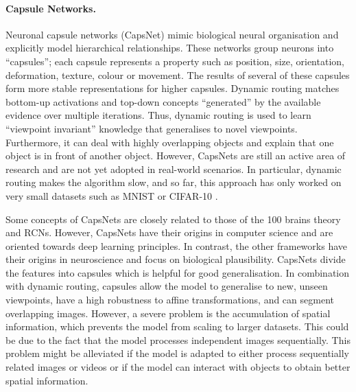 \paragraph{Capsule Networks.} Neuronal capsule networks (CapsNet)  mimic biological neural organisation and explicitly model hierarchical relationships. These networks group neurons into ``capsules''; each capsule represents a property such as position, size, orientation, deformation, texture, colour or movement. The results of several of these capsules form more stable representations for higher capsules. Dynamic routing matches bottom-up activations and top-down concepts ``generated'' by the available evidence over multiple iterations. Thus, dynamic routing is used to learn ``viewpoint invariant'' knowledge that generalises to novel viewpoints.
Furthermore, it can deal with highly overlapping objects and explain that one object is in front of another object. However, CapsNets are still an active area of research and are not yet adopted in real-world scenarios. In particular, dynamic routing makes the algorithm slow, and so far, this approach has only worked on very small datasets such as MNIST \cite{lecun_gradient-based_1998} or CIFAR-10 \cite{krizhevsky_learning_2009}.

Some concepts of CapsNets are closely related to those of the 100 brains theory and RCNs. However, CapsNets have their origins in computer science and are oriented towards deep learning principles. In contrast, the other frameworks have their origins in neuroscience and focus on biological plausibility. CapsNets divide the features into capsules which is helpful for good generalisation. In combination with dynamic routing, capsules allow the model to generalise to new, unseen viewpoints, have a high robustness to affine transformations, and can segment overlapping images. However, a severe problem is the accumulation of spatial information, which prevents the model from scaling to larger datasets. This could be due to the fact that the model processes independent images sequentially. This problem might be alleviated if the model is adapted to either process sequentially related images or videos or if the model can interact with objects to obtain better spatial information.

